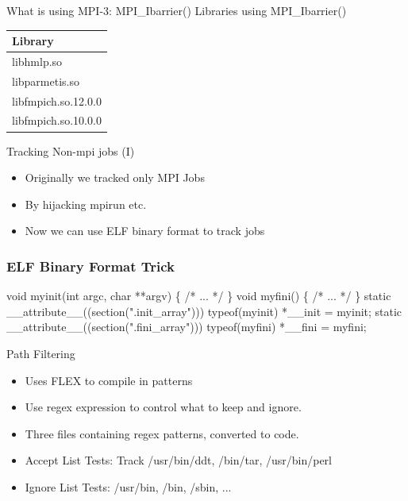 \documentclass{beamer}
\begin{document}
\begin{frame}{What is using MPI-3: MPI\_Ibarrier()}
    Libraries using MPI\_Ibarrier()\\
    \begin{tabular}{|l|}
        \hline
        Library                  \\\hline\hline
        libhmlp.so               \\\hline
        libparmetis.so           \\\hline
        libfmpich.so.12.0.0      \\\hline
        libfmpich.so.10.0.0      \\\hline
    \end{tabular}

\end{frame}

\begin{frame}{Tracking Non-mpi jobs (I)}
  \begin{itemize}
    \item Originally we tracked only MPI Jobs
    \item By hijacking mpirun etc.
    \item Now we can use ELF binary format to track jobs
  \end{itemize}
\end{frame}

\begin{frame}[fragile]
    \frametitle{ELF Binary Format Trick}
 {\small
    \begin{semiverbatim}
void myinit(int argc, char **argv)
\{
  /* ... */
\}
void myfini()
\{
  /* ... */
\}
  static __attribute__((section(".init_array")))
       typeof(myinit) *__init = myinit;
  static __attribute__((section(".fini_array")))
       typeof(myfini) *__fini = myfini;
    \end{semiverbatim}
}
\end{frame}

\begin{frame}{Path Filtering}
  \begin{itemize}
    \item Uses FLEX to compile in patterns
    \item Use regex expression to control what to keep and ignore.
    \item Three files containing regex patterns, converted to code.
    \item Accept List Tests: Track /usr/bin/ddt, /bin/tar, /usr/bin/perl
    \item Ignore List Tests: /usr/bin, /bin, /sbin, ...
  \end{itemize}
\end{frame}
\end{document}
